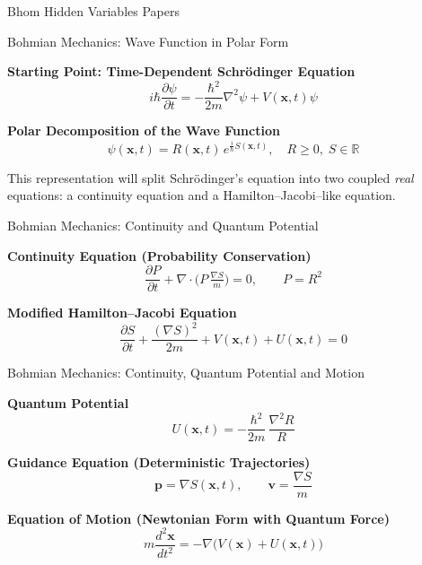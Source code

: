 \begin{frame}{Bhom Hidden Variables Papers}
\begin{minipage}{0.49\textwidth}
  \end{minipage}
\end{frame}

\begin{frame}{Bohmian Mechanics: Wave Function in Polar Form}

  \textbf{Starting Point: Time-Dependent Schrödinger Equation}
  \[
    i\hbar \frac{\partial \psi}{\partial t}
      = -\frac{\hbar^2}{2m}\nabla^2\psi + V(\mathbf{x},t)\psi
  \]

  \pause

  \textbf{Polar Decomposition of the Wave Function}
  \[
    \psi(\mathbf{x},t) = R(\mathbf{x},t)\,e^{\tfrac{i}{\hbar}S(\mathbf{x},t)},
    \quad R \geq 0,\; S\in \mathbb{R}
  \]

  \pause

  This representation will split Schrödinger’s equation into two coupled \emph{real} equations:
  a continuity equation and a Hamilton–Jacobi–like equation.

\end{frame}

\begin{frame}{Bohmian Mechanics: Continuity and Quantum Potential}

  \textbf{Continuity Equation (Probability Conservation)}
  \[
    \frac{\partial P}{\partial t}
      + \nabla\!\cdot\!\big(P\,\tfrac{\nabla S}{m}\big) = 0,
    \qquad P = R^2
  \]

  \pause

  \textbf{Modified Hamilton–Jacobi Equation}
  \[
    \frac{\partial S}{\partial t}
      + \frac{(\nabla S)^2}{2m}
      + V(\mathbf{x},t)
      + U(\mathbf{x},t) = 0
  \]
\end{frame}


\begin{frame}{Bohmian Mechanics: Continuity, Quantum Potential and Motion}

  \textbf{Quantum Potential}
  \[
    U(\mathbf{x},t) = -\frac{\hbar^2}{2m}\,\frac{\nabla^2 R}{R}
  \]

  \pause

  \textbf{Guidance Equation (Deterministic Trajectories)}
  \[
    \mathbf{p} = \nabla S(\mathbf{x},t),
    \qquad \mathbf{v} = \frac{\nabla S}{m}
  \]

  \pause

  \textbf{Equation of Motion (Newtonian Form with Quantum Force)}
  \[
    m \frac{d^2 \mathbf{x}}{dt^2} = - \nabla \Big( V(\mathbf{x}) + U(\mathbf{x},t) \Big)
  \]

\end{frame}



